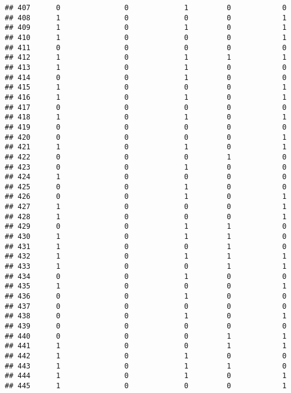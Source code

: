 \documentclass[]{article}
\begin{document}
\begin{verbatim}
## 407      0               0             1         0            0
## 408      1               0             0         0            1
## 409      1               0             1         0            1
## 410      1               0             0         0            1
## 411      0               0             0         0            0
## 412      1               0             1         1            1
## 413      1               0             1         0            0
## 414      0               0             1         0            0
## 415      1               0             0         0            1
## 416      1               0             1         0            1
## 417      0               0             0         0            0
## 418      1               0             1         0            1
## 419      0               0             0         0            0
## 420      0               0             0         0            1
## 421      1               0             1         0            1
## 422      0               0             0         1            0
## 423      0               0             1         0            0
## 424      1               0             0         0            0
## 425      0               0             1         0            0
## 426      0               0             1         0            1
## 427      1               0             0         0            1
## 428      1               0             0         0            1
## 429      0               0             1         1            0
## 430      1               0             1         1            0
## 431      1               0             0         1            0
## 432      1               0             1         1            1
## 433      1               0             0         1            1
## 434      0               0             1         0            0
## 435      1               0             0         0            1
## 436      0               0             1         0            0
## 437      0               0             0         0            0
## 438      0               0             1         0            1
## 439      0               0             0         0            0
## 440      0               0             0         1            1
## 441      1               0             0         1            1
## 442      1               0             1         0            0
## 443      1               0             1         1            0
## 444      1               0             1         0            1
## 445      1               0             0         0            1

\end{verbatim}
\end{document}
